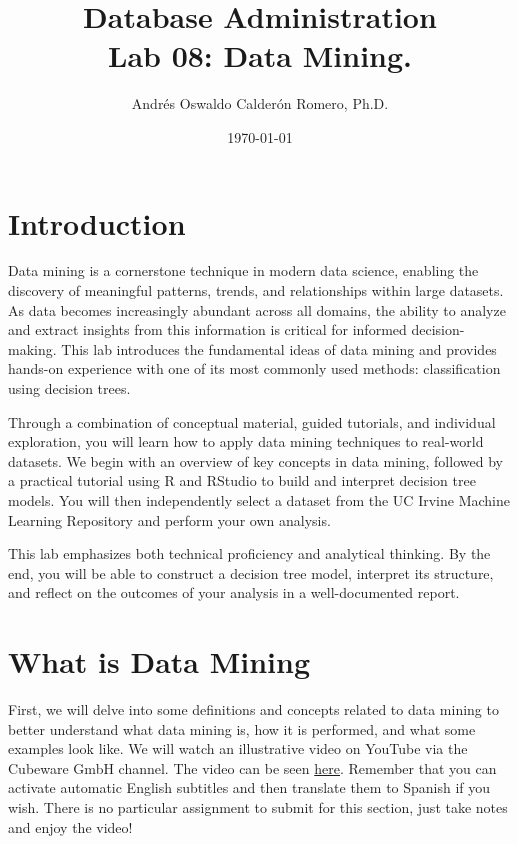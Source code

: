\documentclass{article}
\title{Database Administration \\ Lab 08: Data Mining.}
\author{Andrés Oswaldo Calderón Romero, Ph.D.}
\date{\today}
\begin{document}
\maketitle

\section{Introduction}

Data mining is a cornerstone technique in modern data science, enabling the discovery of meaningful patterns, trends, and relationships within large datasets. As data becomes increasingly abundant across all domains, the ability to analyze and extract insights from this information is critical for informed decision-making. This lab introduces the fundamental ideas of data mining and provides hands-on experience with one of its most commonly used methods: classification using decision trees.

Through a combination of conceptual material, guided tutorials, and individual exploration, you will learn how to apply data mining techniques to real-world datasets. We begin with an overview of key concepts in data mining, followed by a practical tutorial using R and RStudio to build and interpret decision tree models. You will then independently select a dataset from the UC Irvine Machine Learning Repository and perform your own analysis.

This lab emphasizes both technical proficiency and analytical thinking. By the end, you will be able to construct a decision tree model, interpret its structure, and reflect on the outcomes of your analysis in a well-documented report.

\section{What is Data Mining}
First, we will delve into some definitions and concepts related to data mining to better understand what data mining is, how it is performed, and what some examples look like. We will watch an illustrative video on YouTube via the Cubeware GmbH channel. The video can be seen \href{https://youtu.be/81bm2OsEzbg?si=i3HXb8Gk6tr9bI1l}{here}. Remember that you can activate automatic English subtitles and then translate them to Spanish if you wish. There is no particular assignment to submit for this section, just take notes and enjoy the video!
\end{document}
